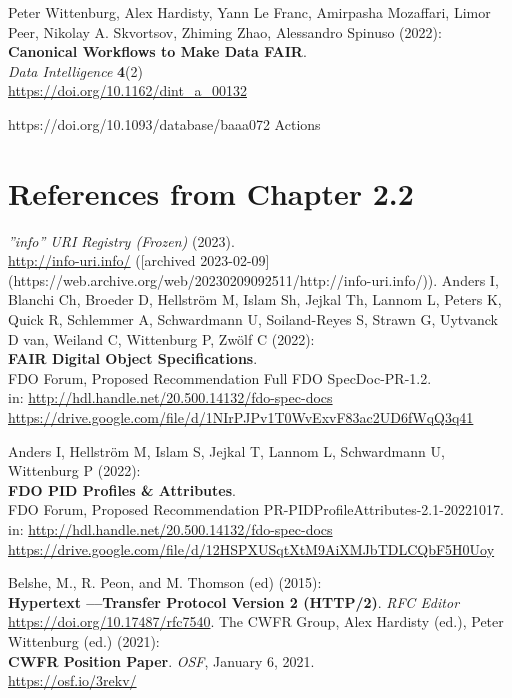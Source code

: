 \begin{thebibliography}{9}
Peter Wittenburg, Alex Hardisty, Yann Le Franc, Amirpasha Mozaffari, Limor Peer, Nikolay A. Skvortsov, Zhiming Zhao, Alessandro Spinuso (2022):\\
\textbf{Canonical Workflows to Make Data FAIR}.\\
\emph{Data Intelligence} \textbf{4}(2)\\
\url{https://doi.org/10.1162/dint_a_00132}


https://doi.org/10.1093/database/baaa072 Actions







\section{References from Chapter 2.2}

\emph{”info” URI Registry (Frozen)} (2023).  \\
\url{http://info-uri.info/} ([archived 2023-02-09](https://web.archive.org/web/20230209092511/http://info-uri.info/)).
{}
Anders I, Blanchi Ch, Broeder D, Hellström M, Islam Sh, Jejkal Th, Lannom L, Peters K, Quick R, Schlemmer A, Schwardmann U, Soiland-Reyes S, Strawn G, Uytvanck D van, Weiland C, Wittenburg P, Zwölf C (2022):\\
\textbf{FAIR Digital Object Specifications}.\\
FDO Forum, Proposed Recommendation Full FDO SpecDoc-PR-1.2. \\
in: \url{http://hdl.handle.net/20.500.14132/fdo-spec-docs}\\
\url{https://drive.google.com/file/d/1NIrPJPv1T0WvExvF83ac2UD6fWqQ3q41}

Anders I, Hellström M, Islam S, Jejkal T, Lannom L, Schwardmann U, Wittenburg P (2022):\\
\textbf{FDO PID Profiles \& Attributes}.\\
FDO Forum,  Proposed Recommendation PR-PIDProfileAttributes-2.1-20221017.
in: \url{http://hdl.handle.net/20.500.14132/fdo-spec-docs}\\
\url{https://drive.google.com/file/d/12HSPXUSqtXtM9AiXMJbTDLCQbF5H0Uoy}


Belshe, M., R. Peon, and M. Thomson (ed) (2015):\\
\textbf{Hypertext ––Transfer Protocol Version 2 (HTTP/2)}. 
\emph{RFC Editor}
\url{https://doi.org/10.17487/rfc7540}.
The CWFR Group, Alex Hardisty (ed.), Peter Wittenburg (ed.)
(2021):\\
\textbf{CWFR Position Paper}. \emph{OSF}, January 6, 2021.\\
\url{https://osf.io/3rekv/}


\end{thebibliography}

